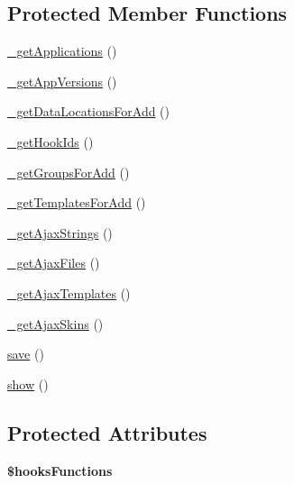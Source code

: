\subsection*{Protected Member Functions}
\begin{DoxyCompactItemize}
\item 
\hyperlink{classadmin__core__ajax__hooks_a9c6eac719f074d96dc839805c0de4311}{\-\_\-get\-Applications} ()
\item 
\hyperlink{classadmin__core__ajax__hooks_ac4751808265a7862904cd661ba84daf6}{\-\_\-get\-App\-Versions} ()
\item 
\hyperlink{classadmin__core__ajax__hooks_a286cead7eec969fbe60fc7eba2ac56b5}{\-\_\-get\-Data\-Locations\-For\-Add} ()
\item 
\hyperlink{classadmin__core__ajax__hooks_a4b875ecc93de608db00def4d6e70cf09}{\-\_\-get\-Hook\-Ids} ()
\item 
\hyperlink{classadmin__core__ajax__hooks_a0261dd4840da0574acd94a460b755a02}{\-\_\-get\-Groups\-For\-Add} ()
\item 
\hyperlink{classadmin__core__ajax__hooks_ab18b855b65b07cb3de2054855e94ffb8}{\-\_\-get\-Templates\-For\-Add} ()
\item 
\hyperlink{classadmin__core__ajax__hooks_a2a2123768f67665f6ad61b792ac0c859}{\-\_\-get\-Ajax\-Strings} ()
\item 
\hyperlink{classadmin__core__ajax__hooks_a6fcba4f0def24c7bfaf21b8bb6357627}{\-\_\-get\-Ajax\-Files} ()
\item 
\hyperlink{classadmin__core__ajax__hooks_ada21be92989bc4c25fb3cb10873c2693}{\-\_\-get\-Ajax\-Templates} ()
\item 
\hyperlink{classadmin__core__ajax__hooks_a5daedd409a6bfa986646bf9b9b96991a}{\-\_\-get\-Ajax\-Skins} ()
\item 
\hyperlink{classadmin__core__ajax__hooks_afc8a3c62679cf00ade9f15fb2a6d6132}{save} ()
\item 
\hyperlink{classadmin__core__ajax__hooks_a2b8e3779f5bd8c38f70307574859bd36}{show} ()
\end{DoxyCompactItemize}
\subsection*{Protected Attributes}
\begin{DoxyCompactItemize}
\item 
\hypertarget{classadmin__core__ajax__hooks_a424696ea91688a33c1b9698a7bf1784f}{{\bfseries \$hooks\-Functions}}\label{classadmin__core__ajax__hooks_a424696ea91688a33c1b9698a7bf1784f}

\end{DoxyCompactItemize}


